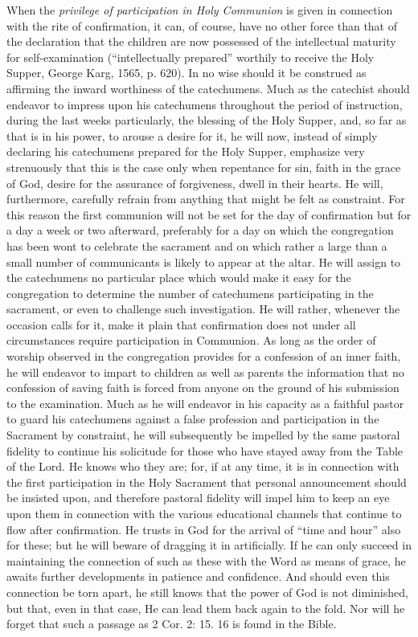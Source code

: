 When the \emph{privilege of participation in Holy Communion} is given in connection with the rite of confirmation, it can, of
course, have no other force than that of the declaration that the children are now possessed of the intellectual maturity for self-examination (“intellectually prepared” worthily to receive the Holy Supper, George Karg, 1565, p. 620). In no wise should it be construed as affirming the inward worthiness of the catechumens. Much as the catechist should endeavor to impress upon his catechumens throughout the period of instruction, during the last weeks particularly, the blessing of the Holy Supper, and, so far as that is in his power, to arouse a desire for it, he will now, instead of simply declaring his catechumens prepared for the Holy Supper, emphasize very strenuously that this is the case only when repentance for sin, faith in the grace of God, desire for the assurance of forgiveness, dwell in their hearts. He will, furthermore, carefully refrain from anything that might be felt as constraint. For this reason the first communion will not be set for the day of confirmation but for a day a week or two afterward, preferably for a day on which the congregation has been wont to celebrate the sacrament and on which rather a large than a small number of communicants is likely to appear at the altar. He will assign to the catechumens no particular place which would make it easy for the congregation to determine the number of catechumens participating in the sacrament, or even to challenge such investigation. He will rather, whenever the occasion calls for it, make it plain that confirmation does not under all circumstances require participation in Communion. As long as the order of worship observed in the congregation provides for a confession of an inner faith, he will endeavor to impart to children as well as parents the information that no confession of saving faith is forced from anyone on the ground of his submission to the examination. Much as he will endeavor in his capacity as a faithful pastor to guard his catechumens against a false profession and participation in the Sacrament by constraint, he will subsequently be impelled by
the same pastoral fidelity to continue his solicitude for those who have stayed away from the Table of the Lord. He knows who they are; for, if at any time, it is in connection with the first participation in the Holy Sacrament that personal announcement should be insisted upon, and therefore pastoral fidelity will impel him to keep an eye upon them in connection with the various educational channels that continue to flow after confirmation. He trusts in God for the arrival of “time and hour” also for these; but he will beware of dragging it in artificially. If he can only succeed in maintaining the connection of such as these with the Word as means of grace, he awaits further developments in patience and confidence. And should even this connection be torn apart, he still knows that the power of God is not diminished, but that, even in that case, He can lead them back again to the fold. Nor will he forget that such a passage as 2 Cor. 2: 15. 16 is found in the Bible.


